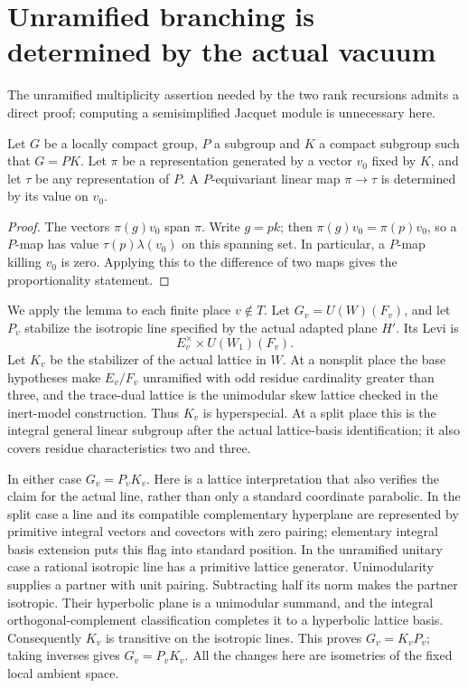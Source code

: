 \section{Unramified branching is determined by the actual vacuum}
\label{sec:sr-unramified-branching-vacuum}

The unramified multiplicity assertion needed by the two rank
recursions admits a direct proof; computing a semisimplified
Jacquet module is unnecessary here.

\begin{srlemma}
Let \(G\) be a locally compact group, \(P\) a subgroup and
\(K\) a compact subgroup such that \(G=PK\).
Let \(\pi\) be a representation generated by a vector \(v_0\)
fixed by \(K\), and let \(\tau\) be any representation of \(P\).
A \(P\)-equivariant linear map \(\pi\to\tau\) is determined
by its value on \(v_0\).
\end{srlemma}

\begin{proof}
The vectors \(\pi(g)v_0\) span \(\pi\). Write \(g=pk\);
then \(\pi(g)v_0=\pi(p)v_0\), so a \(P\)-map has value
\(\tau(p)\lambda(v_0)\) on this spanning set.
In particular, a \(P\)-map killing \(v_0\) is zero.
Applying this to the difference of two maps gives
the proportionality statement.
\end{proof}

We apply the lemma to each finite place \(v\notin T\).
Let \(G_v=U(W)(F_v)\), and let \(P_v\) stabilize the
isotropic line specified by the actual adapted plane \(H'\).
Its Levi is
\[
               E_v^\times\times U(W_1)(F_v).
\]
Let \(K_v\) be the stabilizer of the actual lattice in \(W\).
At a nonsplit place the base hypotheses make \(E_v/F_v\)
unramified with odd residue cardinality greater than three,
and the trace-dual lattice is the unimodular skew lattice
checked in the inert-model construction. Thus \(K_v\) is
hyperspecial. At a split place this is the integral
general linear subgroup after the actual lattice-basis
identification; it also covers residue characteristics
two and three.

In either case \(G_v=P_vK_v\).
Here is a lattice interpretation that also verifies the
claim for the actual line, rather than only a standard
coordinate parabolic. In the split case a line and its
compatible complementary hyperplane are represented by
primitive integral vectors and covectors with zero
pairing; elementary integral basis extension puts this
flag into standard position. In the unramified unitary
case a rational isotropic line has a primitive lattice
generator. Unimodularity supplies a partner with unit
pairing. Subtracting half its norm makes the partner
isotropic. Their hyperbolic plane is a unimodular
summand, and the integral orthogonal-complement
classification completes it to a hyperbolic lattice
basis. Consequently \(K_v\) is transitive on the
isotropic lines. This proves \(G_v=K_vP_v\);
taking inverses gives \(G_v=P_vK_v\).
All the changes here are isometries of the fixed local
ambient space.

